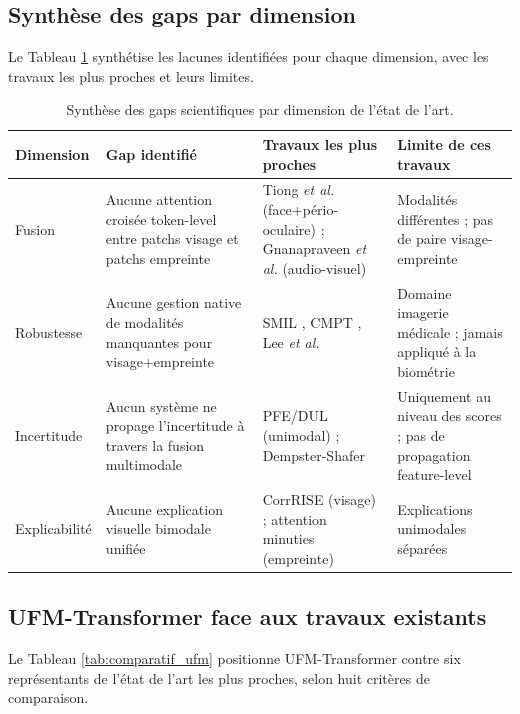 \documentclass[12pt,a4paper]{report}
\begin{document}
\subsection{Synth\`{e}se des gaps par dimension}

Le Tableau \ref{tab:gaps} synth\'{e}tise les lacunes identifi\'{e}es pour chaque dimension, avec les travaux les plus proches et leurs limites.

\begin{table}[htbp]
\centering
\caption{Synth\`{e}se des gaps scientifiques par dimension de l'\'{e}tat de l'art.}
\label{tab:gaps}
\small
\begin{tabular}{>{\raggedright}p{2.5cm}>{\raggedright}p{5.5cm}>{\raggedright}p{4.5cm}>{\raggedright\arraybackslash}p{3.0cm}}
\hline
\textbf{Dimension} & \textbf{Gap identifi\'{e}} & \textbf{Travaux les plus proches} & \textbf{Limite de ces travaux} \\
\hline
\hline
Fusion & Aucune attention crois\'{e}e token-level entre patchs visage et patchs empreinte & Tiong \textit{et al.} \cite{tiong2024flexible} (face+p\'{e}rio-oculaire) ; Gnanapraveen \textit{et al.} \cite{gnanapraveen2024cross} (audio-visuel) & Modalit\'{e}s diff\'{e}rentes ; pas de paire visage-empreinte \\
\hline
Robustesse & Aucune gestion native de modalit\'{e}s manquantes pour visage+empreinte & SMIL \cite{ma2021smil}, CMPT \cite{reza2025cmpt}, Lee \textit{et al.} \cite{lee2023multimodal} & Domaine imagerie m\'{e}dicale ; jamais appliqu\'{e} \`{a} la biom\'{e}trie \\
\hline
Incertitude & Aucun syst\`{e}me ne propage l'incertitude \`{a} travers la fusion multimodale & PFE/DUL \cite{shi2019pfe, chang2020data} (unimodal) ; Dempster-Shafer \cite{nguyen2015score} & Uniquement au niveau des scores ; pas de propagation feature-level \\
\hline
Explicabilit\'{e} & Aucune explication visuelle bimodale unifi\'{e}e & CorrRISE \cite{lu2024corrRISE} (visage) ; attention minuties \cite{tan2021minutiae} (empreinte) & Explications unimodales s\'{e}par\'{e}es \\
\hline
\end{tabular}
\end{table}

\subsection{UFM-Transformer face aux travaux existants}

Le Tableau \ref{tab:comparatif_ufm} positionne UFM-Transformer contre six repr\'{e}sentants de l'\'{e}tat de l'art les plus proches, selon huit crit\`{e}res de comparaison.
\end{document}
